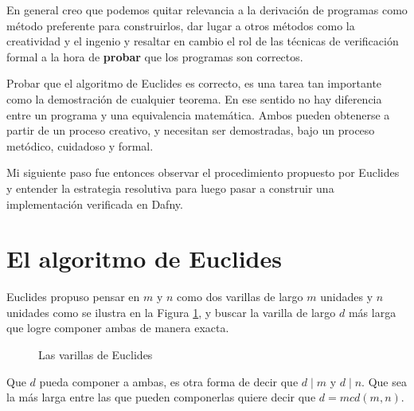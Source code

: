 \documentclass[12pt, a4paper, openany, fleqn]{book}
\begin{document}
    En general creo que podemos quitar relevancia a la derivación de programas como método preferente para construirlos, dar lugar a otros métodos como la creatividad y el ingenio y resaltar en cambio el rol de las técnicas de verificación formal a la hora de \textbf{probar} que los programas son correctos.

    Probar que el algoritmo de Euclides es correcto, es una tarea tan importante como la demostración de cualquier teorema. En ese sentido no hay diferencia entre un programa y una equivalencia matemática. Ambos pueden obtenerse a partir de un proceso creativo, y necesitan ser demostradas, bajo un proceso metódico, cuidadoso y formal.

    Mi siguiente paso fue entonces observar el procedimiento propuesto por Euclides y entender la estrategia resolutiva para luego pasar a construir una implementación verificada en Dafny.

    \section{El algoritmo de Euclides}
    \label{desarrollo_euclides}
    Euclides propuso pensar en $m$ y $n$ como dos varillas de largo $m$ unidades y $n$ unidades como se ilustra en la Figura \ref{varillas_euclides}, y buscar la varilla de largo $d$ más larga que logre componer ambas de manera exacta.
    
    \begin{figure}[h]
        \centering
        \caption{Las varillas de Euclides} \label{varillas_euclides}
    \end{figure}

    Que $d$ pueda componer a ambas, es otra forma de decir que $d \mid m$ y $d \mid n$. Que sea la más larga entre las que pueden componerlas quiere decir que $d = mcd(m,n)$.
\end{document}
